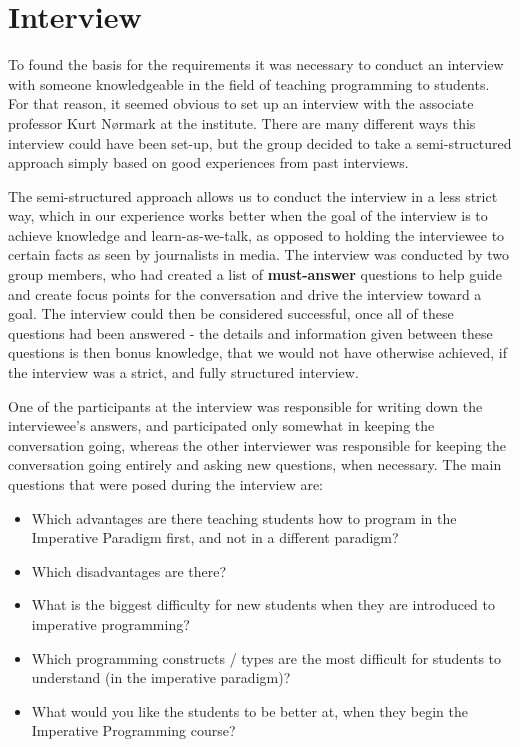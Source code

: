 \section{Interview}

To found the basis for the requirements it was necessary to conduct an interview with someone knowledgeable in the field of teaching programming to 
students. For that reason, it seemed obvious to set up an interview with the associate professor Kurt N{\o}rmark at the institute. There are many 
different ways this interview could have been set-up, but the group decided to take a semi-structured approach simply based on good experiences from 
past interviews. 


The semi-structured approach allows us to conduct the interview in a less strict way, which in our experience works better when the goal of the 
interview is to achieve knowledge and learn-as-we-talk, as opposed to holding the interviewee to certain facts as seen by journalists in media. The 
interview was conducted by two group members, who had created a list of \textbf{must-answer} questions to help guide and create focus points for the 
conversation and drive the interview toward a goal. The interview could then be considered successful, once all of these questions had been answered - 
the details and information given between these questions is then bonus knowledge, that we would not have otherwise achieved, if the interview was a 
strict, and fully structured interview.

One of the participants at the interview was responsible for writing down the interviewee's answers, and participated only somewhat in keeping the 
conversation going, whereas the other interviewer was responsible for keeping the conversation going entirely and asking new questions, when necessary. 
The main questions that were posed during the interview are:

\begin{itemize}
	\item Which advantages are there teaching students how to program in the Imperative Paradigm first, and not in a different paradigm?
	\item Which disadvantages are there?
	\item What is the biggest difficulty for new students when they are introduced to imperative programming?
	\item Which programming constructs / types are the most difficult for students to understand (in the imperative paradigm)?
	\item What would you like the students to be better at, when they begin the Imperative Programming course?
\end{itemize}


